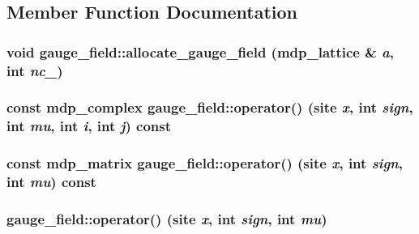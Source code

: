 \subsection{Member Function Documentation}
\hypertarget{classgauge__field_ac7af990c989c01f0254a5454fc365dd7}{
\subsubsection[{allocate\_\-gauge\_\-field}]{\setlength{\rightskip}{0pt plus 5cm}void gauge\_\-field::allocate\_\-gauge\_\-field ({\bf mdp\_\-lattice} \& {\em a}, \/  int {\em nc\_\-})}}
\label{classgauge__field_ac7af990c989c01f0254a5454fc365dd7}
\hypertarget{classgauge__field_a9dd484a3ca793d5e0376bbe2c2cd8995}{
\subsubsection[{operator()}]{\setlength{\rightskip}{0pt plus 5cm}const {\bf mdp\_\-complex} gauge\_\-field::operator() (site {\em x}, \/  int {\em sign}, \/  int {\em mu}, \/  int {\em i}, \/  int {\em j}) const}}
\label{classgauge__field_a9dd484a3ca793d5e0376bbe2c2cd8995}
\hypertarget{classgauge__field_afc4082b84abc10e1be05168c9898fddd}{
\subsubsection[{operator()}]{\setlength{\rightskip}{0pt plus 5cm}const {\bf mdp\_\-matrix} gauge\_\-field::operator() (site {\em x}, \/  int {\em sign}, \/  int {\em mu}) const}}
\label{classgauge__field_afc4082b84abc10e1be05168c9898fddd}
\hypertarget{classgauge__field_a8d68963fa439cf58c3ac16c043523010}{
\subsubsection[{operator()}]{ gauge\_\-field::operator() (site {\em x}, \/  int {\em sign}, \/  int {\em mu})}}
